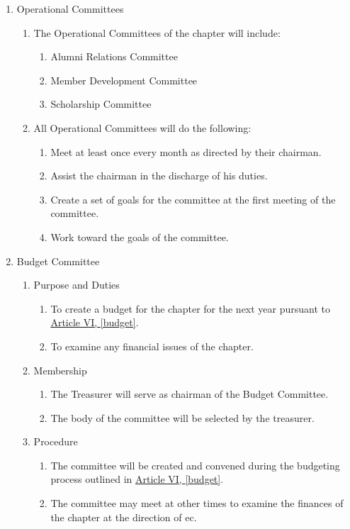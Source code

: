 \begin{enumerate}
\begin{enumerate}
			\item Operational Committees \label{op-comm}
				\begin{enumerate}
					\item The Operational Committees of the chapter will include:

						\begin{enumerate}
							\item Alumni Relations Committee
							\item Member Development Committee
							\item Scholarship Committee
						\end{enumerate}

					\item All Operational Committees will do the following:
						\begin{enumerate}
							\item Meet at least once every month as directed by their chairman.
							\item Assist the chairman in the discharge of his duties.
							\item Create a set of goals for the committee at the first meeting of the committee.
							\item Work toward the goals of the committee.
						\end{enumerate}
				\end{enumerate}

			\item Budget Committee
				\label{budget-committee}
				\begin{enumerate}
					\item Purpose and Duties
						\begin{enumerate}
							\item To create a budget for the chapter for the next year pursuant to \hyperref[budget]{Article VI, \autoref*{budget}}.
							\item To examine any financial issues of the chapter.
						\end{enumerate}

					\item Membership
						\begin{enumerate}
							\item The Treasurer will serve as chairman of the Budget Committee.
							\item The body of the committee will be selected by the treasurer.
						\end{enumerate}

					\item Procedure
						\begin{enumerate}
							\item The committee will be created and convened during the budgeting process outlined in \hyperref[budget]{Article VI, \autoref*{budget}}.
							\item The committee may meet at other times to examine the finances of the chapter at the direction of \gls{ec}.
						\end{enumerate}
				\end{enumerate}


\end{enumerate}
\end{enumerate}
